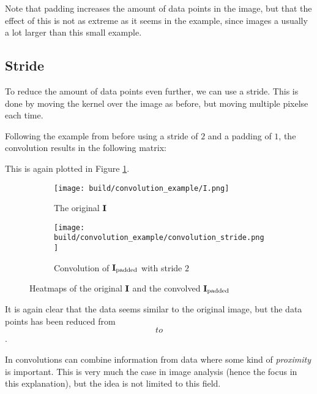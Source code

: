 Note that padding increases the amount of data points in the image, but that
the effect of this is not as extreme as it seems in the example, since images a usually
a lot larger than this small example.

\subsection{Stride}
To reduce the amount of data points even further, we can use a stride.
This is done by moving the kernel over the image as before, but moving multiple pixelse each time.

Following the example from before using a stride of $2$ and a padding of $1$, the convolution results in the following matrix:
\begin{equation}
    
\end{equation}

This is again plotted in Figure \ref{fig:convolution_example_stride}.

\begin{figure}[ht]
\centering
\begin{subfigure}{0.45\textwidth}
    \texttt{[image: build/convolution\_example/I.png]}
    \caption{The original $\textbf{I}$}
\end{subfigure}
\begin{subfigure}{0.45\textwidth}
    \texttt{[image: build/convolution\_example/convolution\_stride.png]}
    \caption{Convolution of $\textbf{I}_{\text{padded}}$ with stride $2$}
\end{subfigure}
\caption{Heatmaps of the original $\textbf{I}$ and the convolved $\textbf{I}_{\text{padded}}$}
\label{fig:convolution_example_stride}
\end{figure}

It is again clear that the data seems similar to the original image, but the data points
has been reduced from $$ to $$.

In convolutions can combine information from data where some kind of \textit{proximity} is important.
This is very much the case in image analysis (hence the focus in this explanation), but the idea is
not limited to this field.

